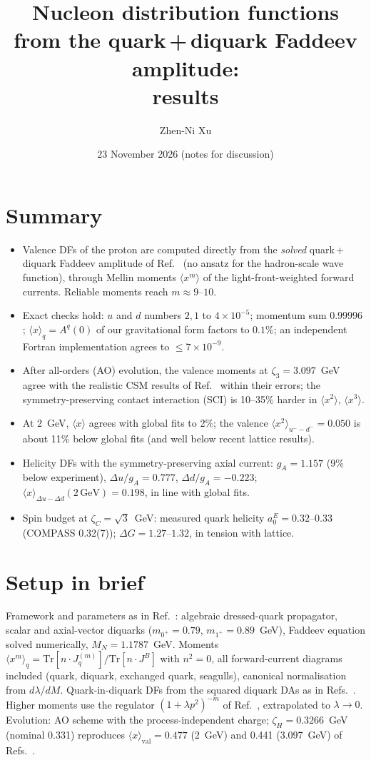 \documentclass[11pt,a4paper]{article}
\title{Nucleon distribution functions from the quark\,+\,diquark Faddeev amplitude:\\ results}
\author{Zhen-Ni Xu}
\date{23 November 2026 \quad (notes for discussion)}
\newcommand{\zH}{\zeta_H}
\newcommand{\mom}[1]{\langle #1\rangle}
\begin{document}
\maketitle

\section*{Summary}
\begin{itemize}
\item Valence DFs of the proton are computed directly from the \emph{solved} quark\,+\,diquark Faddeev amplitude of
  Ref.~\cite{Cheng:2026gff} (no ansatz for the hadron-scale wave function), through Mellin moments $\mom{x^m}$ of the
  light-front-weighted forward currents. Reliable moments reach $m \approx 9$--$10$.
\item Exact checks hold: $u$ and $d$ numbers $2,1$ to $4\times10^{-5}$; momentum sum $0.99996$; $\mom{x}_q = A^q(0)$
  of our gravitational form factors to $0.1\%$; an independent Fortran implementation agrees to $\le 7\times10^{-9}$.
\item After all-orders (AO) evolution, the valence moments at $\zeta_3 = 3.097$~GeV agree with the realistic CSM
  results of Ref.~\cite{Lu:2022cjx} within their errors; the symmetry-preserving contact interaction (SCI) is
  10--35\% harder in $\mom{x^2}$, $\mom{x^3}$.
\item At 2~GeV, $\mom{x}$ agrees with global fits to 2\%; the valence $\mom{x^2}_{u^- - d^-} = 0.050$ is about 11\% below
  global fits (and well below recent lattice results).
\item Helicity DFs with the symmetry-preserving axial current: $g_A = 1.157$ (9\% below experiment),
  $\Delta u/g_A = 0.777$, $\Delta d/g_A = -0.223$; $\mom{x}_{\Delta u - \Delta d}(2\,\text{GeV}) = 0.198$, in line with
  global fits.
\item Spin budget at $\zeta_C = \sqrt{3}$~GeV: measured quark helicity $a_0^E = 0.32$--$0.33$ (COMPASS 0.32(7));
  $\Delta G = 1.27$--$1.32$, in tension with lattice.
\end{itemize}

\section{Setup in brief}
Framework and parameters as in Ref.~\cite{Cheng:2026gff}: algebraic dressed-quark propagator, scalar and axial-vector
diquarks ($m_{0^+} = 0.79$, $m_{1^+} = 0.89$~GeV), Faddeev equation solved numerically, $M_N = 1.1787$~GeV.
Moments $\mom{x^m}_q = \mathrm{Tr}[n\cdot J^{(m)}_q]/\mathrm{Tr}[n\cdot J^B]$ with $n^2 = 0$, all forward-current
diagrams included (quark, diquark, exchanged quark, seagulls), canonical normalisation from $d\lambda/dM$.
Quark-in-diquark DFs from the squared diquark DAs as in Refs.~\cite{EPJC84:739,Yu:2025sci}. Higher moments use the
regulator $(1+\lambda p^2)^{-m}$ of Ref.~\cite{Bednar:2018mtf}, extrapolated to $\lambda \to 0$. Evolution: AO scheme
with the process-independent charge; $\zH = 0.3266$~GeV (nominal 0.331) reproduces $\mom{x}_\text{val} = 0.477$
(2~GeV) and 0.441 (3.097~GeV) of Refs.~\cite{EPJC84:739,Yu:2025sci}.
\end{document}
